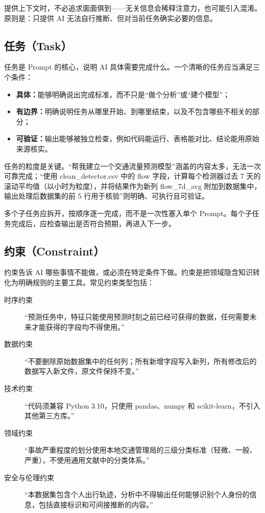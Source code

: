 提供上下文时，不必追求面面俱到——无关信息会稀释注意力，也可能引入混淆。原则是：只提供 AI 无法自行推断、但对当前任务确实必要的信息。

\subsection{任务（Task）}

任务是 Prompt 的核心，说明 AI 具体需要完成什么。一个清晰的任务应当满足三个条件：

\begin{itemize}
  \item \textbf{具体：}能够明确说出完成标准，而不只是“做个分析”或“建个模型”；
  \item \textbf{有边界：}明确说明任务从哪里开始、到哪里结束，以及不包含哪些不相关的部分；
  \item \textbf{可验证：}输出能够被独立检查，例如代码能运行、表格能对比、结论能用原始来源核实。
\end{itemize}

任务的粒度是关键。“帮我建立一个交通流量预测模型”涵盖的内容太多，无法一次可靠完成；“使用 clean\_detector.csv 中的 flow 字段，计算每个检测器过去 7 天的滚动平均值（以小时为粒度），并将结果作为新列 flow\_7d\_avg 附加到数据集中，输出处理后数据集的前 5 行用于核验”则明确、可执行且可验证。

多个子任务应拆开，按顺序逐一完成，而不是一次性塞入单个 Prompt。每个子任务完成后，应检查输出是否符合预期，再进入下一步。

\subsection{约束（Constraint）}

约束告诉 AI 哪些事情不能做，或必须在特定条件下做。约束是把领域隐含知识转化为明确规则的主要工具。常见约束类型包括：

\begin{description}
  \item[时序约束]“预测任务中，特征只能使用预测时刻之前已经可获得的数据，任何需要未来才能获得的字段均不得使用。”
  \item[数据约束]“不要删除原始数据集中的任何列；所有新增字段写入新列，所有修改后的数据写入新文件，原文件保持不变。”
  \item[技术约束]“代码须兼容 Python 3.10，只使用 pandas、numpy 和 scikit-learn，不引入其他第三方库。”
  \item[领域约束]“事故严重程度的划分使用本地交通管理局的三级分类标准（轻微、一般、严重），不使用通用文献中的分类体系。”
  \item[安全与伦理约束]“本数据集包含个人出行轨迹，分析中不得输出任何能够识别个人身份的信息，包括直接标识和可间接推断的内容。”
\end{description}

